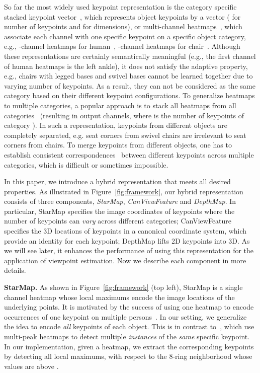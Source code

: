 \documentclass[runningheads]{llncs}
\begin{document}
So far the most widely used keypoint representation is the category specific stacked keypoint vector~\cite{toshev2014deeppose}, which represents object keypoints by a  vector ( for number of keypoints and  for dimensions), or multi-channel heatmaps~\cite{tompson2014joint,newell2016stacked}, which associate each channel with one specific keypoint on a specific object category, e.g., -channel heatmaps for human~\cite{tompson2014joint,newell2016stacked}, -channel heatmaps for chair~\cite{wu2016single}.
Although these representations are certainly semantically meaningful (e.g., the first channel of human heatmaps is the left ankle), it does not satisfy the adaptive property, e.g., chairs with legged bases and swivel bases cannot be learned together due to varying number of keypoints.
As a result, they can not be considered as the same category based on their different keypoint configurations.
To generalize heatmaps to multiple categories, 
a popular approach is to stack all heatmaps from all categories~\cite{tulsiani2015viewpoints,pavlakos20176} (resulting in  output channels, where  is the number of keypoints of category ).
In such a representation, keypoints from different objects are completely separated,
e.g. seat corners from swivel chairs are irrelevant to seat corners from chairs. To merge keypoints from different objects, one has to establish consistent correspondences~\cite{zhou2016learning} between different keypoints across multiple categories, which is difficult or sometimes impossible.

In this paper, we introduce a hybrid representation that meets all desired properties. 
As illustrated in Figure~\ref{fig:framework}, our hybrid representation consists of three components, \emph{StarMap}, \emph{CanViewFeature} and \emph{DepthMap}. 
In particular, StarMap specifies the image coordinates of keypoints where the number of keypoints can \emph{vary} across different categories; 
CanViewFeature specifies the 3D locations of keypoints in a canonical coordinate system, which provide an identity for each keypoint; 
DepthMap lifts 2D keypoints into 3D. As we will see later, it enhances the performance of using this representation for the application of viewpoint estimation. 
Now we describe each component in more details.


\noindent\textbf{StarMap.} As shown in Figure~\ref{fig:framework} (top left), StarMap is a single channel heatmap whose local maximums encode the image locations of the underlying points. 
It is motivated by the success of using one heatmap to encode occurrences of one keypoint on multiple persons~\cite{cao2017realtime,newell2017associative}. 
In our setting, we generalize the idea to encode \emph{all} keypoints of each object.
This is in contrast to~\cite{cao2017realtime,newell2017associative}, which use multi-peak heatmaps to detect multiple \emph{instances} of the \emph{same} specific keypoint. In our implementation, given a heatmap, we extract the corresponding keypoints by detecting all local maximums, with respect to the 8-ring neighborhood whose values are above . 
\end{document}
